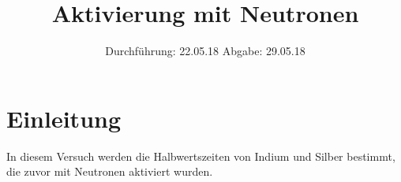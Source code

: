 
\setlength{\parindent}{0 pt}

\subject{V702}
\title{Aktivierung mit Neutronen}
\date{%
  Durchführung: 22.05.18
  \hspace{3em}
  Abgabe: 29.05.18
}



\maketitle
\thispagestyle{empty}
\tableofcontents
\newpage

\section{Einleitung}

In diesem Versuch werden die Halbwertszeiten von Indium und Silber bestimmt,
die zuvor mit Neutronen aktiviert wurden.







\printbibliography{}


